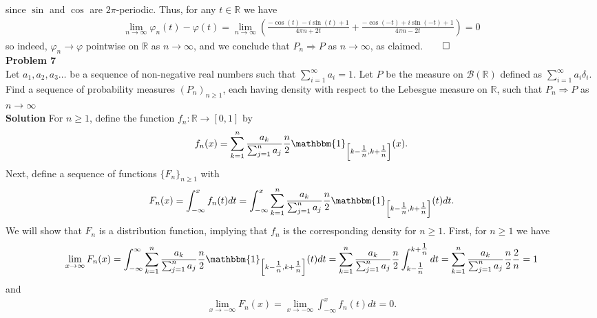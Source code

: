 \documentclass[10pt]{article}
\newcommand{\bp}[1]{\left({#1}\right)}
\newcommand{\mbb}[1]{\mathbb{#1}}
\newcommand{\1}[1]{\mathbbm{1}_{#1}}
\newcommand{\mc}[1]{\mathcal{#1}}
\begin{document}
    since $\sin$ and $\cos$ are $2\pi$-periodic. Thus, for any $t\in\mbb{R}$ we have
    \begin{align*}
        \lim_{n\rightarrow\infty}\varphi_n(t)-\varphi(t)=\lim_{n\rightarrow\infty}\bp{\frac{-\cos(t)-i\sin(t)+1}{4\pi n+2t}+\frac{-\cos(-t)+i\sin(-t)+1}{4\pi n-2t}}=0
    \end{align*}
    so indeed, $\varphi_n\rightarrow\varphi$ pointwise on $\mbb{R}$ as $n\rightarrow\infty$, and we conclude that $P_n\Longrightarrow P$ as $n\rightarrow\infty$, as claimed.\hfill{$\qed$\\[5pt]}
    {\bf Problem 7}\\[5pt]
    Let $a_1,a_2,a_3\dots$ be a sequence of non-negative real numbers such that $\sum_{i=1}^\infty a_i=1$. Let $P$ be the measure on $\mc{B}(\mbb{R})$ defined as $\sum_{i=1}^\infty a_i\delta_i$. Find a sequence of probability measures $(P_n)_{n\geq 1}$, each having density
    with respect to the Lebesgue measure on $\mbb{R}$, such that $P_n\Longrightarrow P$ as $n\rightarrow\infty$\\[5pt]
    {\bf Solution}\hspace{5pt} For $n\geq 1$, define the function $f_n:\mbb{R}\rightarrow[0,1]$ by
    \begin{align*}
        f_n(x)=\sum_{k=1}^n\frac{a_k}{\sum_{j=1}^na_j}\frac{n}{2}\1{\left[k-\tfrac{1}{n},k+\tfrac{1}{n}\right]}(x).
    \end{align*}
    Next, define a sequence of functions $\{F_n\}_{n\geq 1}$ with
    \begin{align*}
        F_n(x)=\int_{-\infty}^xf_n(t)dt=\int_{-\infty}^x\sum_{k=1}^n\frac{a_k}{\sum_{j=1}^na_j}\frac{n}{2}\1{\left[k-\tfrac{1}{n},k+\tfrac{1}{n}\right]}(t)dt.
    \end{align*}
    We will show that $F_n$ is a distribution function, implying that $f_n$ is the corresponding density for $n\geq 1$. First, for $n\geq 1$ we have
    \begin{align*}
        \lim_{x\rightarrow\infty}F_n(x)=\int_{-\infty}^\infty\sum_{k=1}^n\frac{a_k}{\sum_{j=1}^na_j}\frac{n}{2}\1{\left[k-\tfrac{1}{n},k+\tfrac{1}{n}\right]}(t)dt=\sum_{k=1}^n\frac{a_k}{\sum_{j=1}^na_j}\frac{n}{2}\int_{k-\tfrac{1}{n}}^{k+\tfrac{1}{n}}dt=\sum_{k=1}^n\frac{a_k}{\sum_{j=1}^na_j}\frac{n}{2}\frac{2}{n}=1
    \end{align*}
    and
    \begin{align*}
        \lim_{x\rightarrow-\infty}F_n(x)=\lim_{x\rightarrow-\infty}\int_{-\infty}^xf_n(t)dt=0.
    \end{align*}
\end{document}
